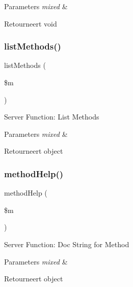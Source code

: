 \begin{DoxyParams}{Parameters}
{\em mixed} & \\
\hline
\end{DoxyParams}
\begin{DoxyReturn}{Retourneert}
void 
\end{DoxyReturn}
\mbox{\label{class_c_i___xmlrpcs_ad640f0b44d1956a05cfe40bab4e4043d}} 
\subsubsection{\texorpdfstring{listMethods()}{listMethods()}}
{\footnotesize\ttfamily list\+Methods (\begin{DoxyParamCaption}\item[{}]{\$m }\end{DoxyParamCaption})}

Server Function\+: List Methods


\begin{DoxyParams}{Parameters}
{\em mixed} & \\
\hline
\end{DoxyParams}
\begin{DoxyReturn}{Retourneert}
object 
\end{DoxyReturn}
\mbox{\label{class_c_i___xmlrpcs_a97626f30e860f4a63463f8674827dc00}} 
\subsubsection{\texorpdfstring{methodHelp()}{methodHelp()}}
{\footnotesize\ttfamily method\+Help (\begin{DoxyParamCaption}\item[{}]{\$m }\end{DoxyParamCaption})}

Server Function\+: Doc String for Method


\begin{DoxyParams}{Parameters}
{\em mixed} & \\
\hline
\end{DoxyParams}
\begin{DoxyReturn}{Retourneert}
object 
\end{DoxyReturn}
\mbox{\label{class_c_i___xmlrpcs_a9f96cc0bd3338094174eb22cd90d6f2a}} 
